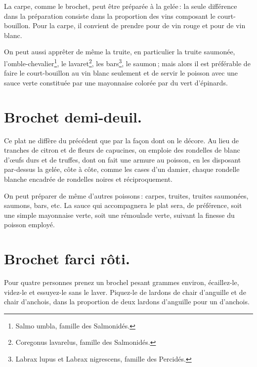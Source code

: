 La carpe, comme le brochet, peut être préparée à la gelée : la seule différence
dans la préparation consiste dans la proportion des vins composant le
court-bouillon. Pour la carpe, il convient de prendre {\mmm} pour
{\mmm} de vin rouge et {\mmm} pour {\mmm} de vin blanc.

\sk

On peut aussi apprêter de même la truite, en particulier la truite saumonée,
l'omble-chevalier\footnote{Salmo umbla, famille des Salmonidés.}, le
lavaret\footnote{Coregonus lavarelus, famille des Salmonidés.}, les
bars\footnote{Labrax lupus et Labrax nigrescens, famille des Percidés.}, le
saumon ; mais alors il est préférable de faire le court-bouillon au vin blanc
seulement et de servir le poisson avec une sauce verte constituée par une
mayonnaise colorée par du vert d'épinards.

\section*{\centering Brochet demi-deuil.}

Ce plat ne diffère du précédent que par la façon dont on le décore. Au lieu de
tranches de citron et de fleurs de capucines, on emploie des rondelles de blanc
d'œufs durs et de truffes, dont on fait une armure au poisson, en les disposant
par-dessus la gelée, côte à côte, comme les cases d'un damier, chaque rondelle
blanche encadrée de rondelles noires et réciproquement.

\sk

On peut préparer de même d’autres poissons : carpes, truites, truites
saumonées, saumons, bars, etc. La sauce qui accompagnera le plat sera, de
préférence, soit une simple mayonnaise verte, soit une rémoulade verte, suivant
la finesse du poisson employé.

\section*{\centering Brochet farci rôti.}

Pour quatre personnes prenez un brochel pesant {\mmm} grammes environ,
écaillez-le, videz-le et essuyez-le sans le laver. Piquez-le de lardons de
chair d'anguille et de chair d'anchois, dans la proportion de deux lardons
d'anguille pour un d'anchois.

